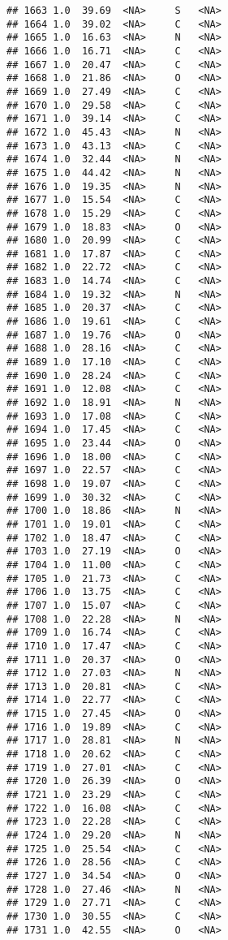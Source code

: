 \documentclass[
]{article}
\begin{document}
\begin{verbatim}
## 1663 1.0  39.69  <NA>     S   <NA>
## 1664 1.0  39.02  <NA>     C   <NA>
## 1665 1.0  16.63  <NA>     N   <NA>
## 1666 1.0  16.71  <NA>     C   <NA>
## 1667 1.0  20.47  <NA>     C   <NA>
## 1668 1.0  21.86  <NA>     O   <NA>
## 1669 1.0  27.49  <NA>     C   <NA>
## 1670 1.0  29.58  <NA>     C   <NA>
## 1671 1.0  39.14  <NA>     C   <NA>
## 1672 1.0  45.43  <NA>     N   <NA>
## 1673 1.0  43.13  <NA>     C   <NA>
## 1674 1.0  32.44  <NA>     N   <NA>
## 1675 1.0  44.42  <NA>     N   <NA>
## 1676 1.0  19.35  <NA>     N   <NA>
## 1677 1.0  15.54  <NA>     C   <NA>
## 1678 1.0  15.29  <NA>     C   <NA>
## 1679 1.0  18.83  <NA>     O   <NA>
## 1680 1.0  20.99  <NA>     C   <NA>
## 1681 1.0  17.87  <NA>     C   <NA>
## 1682 1.0  22.72  <NA>     C   <NA>
## 1683 1.0  14.74  <NA>     C   <NA>
## 1684 1.0  19.32  <NA>     N   <NA>
## 1685 1.0  20.37  <NA>     C   <NA>
## 1686 1.0  19.61  <NA>     C   <NA>
## 1687 1.0  19.76  <NA>     O   <NA>
## 1688 1.0  28.16  <NA>     C   <NA>
## 1689 1.0  17.10  <NA>     C   <NA>
## 1690 1.0  28.24  <NA>     C   <NA>
## 1691 1.0  12.08  <NA>     C   <NA>
## 1692 1.0  18.91  <NA>     N   <NA>
## 1693 1.0  17.08  <NA>     C   <NA>
## 1694 1.0  17.45  <NA>     C   <NA>
## 1695 1.0  23.44  <NA>     O   <NA>
## 1696 1.0  18.00  <NA>     C   <NA>
## 1697 1.0  22.57  <NA>     C   <NA>
## 1698 1.0  19.07  <NA>     C   <NA>
## 1699 1.0  30.32  <NA>     C   <NA>
## 1700 1.0  18.86  <NA>     N   <NA>
## 1701 1.0  19.01  <NA>     C   <NA>
## 1702 1.0  18.47  <NA>     C   <NA>
## 1703 1.0  27.19  <NA>     O   <NA>
## 1704 1.0  11.00  <NA>     C   <NA>
## 1705 1.0  21.73  <NA>     C   <NA>
## 1706 1.0  13.75  <NA>     C   <NA>
## 1707 1.0  15.07  <NA>     C   <NA>
## 1708 1.0  22.28  <NA>     N   <NA>
## 1709 1.0  16.74  <NA>     C   <NA>
## 1710 1.0  17.47  <NA>     C   <NA>
## 1711 1.0  20.37  <NA>     O   <NA>
## 1712 1.0  27.03  <NA>     N   <NA>
## 1713 1.0  20.81  <NA>     C   <NA>
## 1714 1.0  22.77  <NA>     C   <NA>
## 1715 1.0  27.45  <NA>     O   <NA>
## 1716 1.0  19.89  <NA>     C   <NA>
## 1717 1.0  28.81  <NA>     N   <NA>
## 1718 1.0  20.62  <NA>     C   <NA>
## 1719 1.0  27.01  <NA>     C   <NA>
## 1720 1.0  26.39  <NA>     O   <NA>
## 1721 1.0  23.29  <NA>     C   <NA>
## 1722 1.0  16.08  <NA>     C   <NA>
## 1723 1.0  22.28  <NA>     C   <NA>
## 1724 1.0  29.20  <NA>     N   <NA>
## 1725 1.0  25.54  <NA>     C   <NA>
## 1726 1.0  28.56  <NA>     C   <NA>
## 1727 1.0  34.54  <NA>     O   <NA>
## 1728 1.0  27.46  <NA>     N   <NA>
## 1729 1.0  27.71  <NA>     C   <NA>
## 1730 1.0  30.55  <NA>     C   <NA>
## 1731 1.0  42.55  <NA>     O   <NA>

\end{verbatim}
\end{document}
